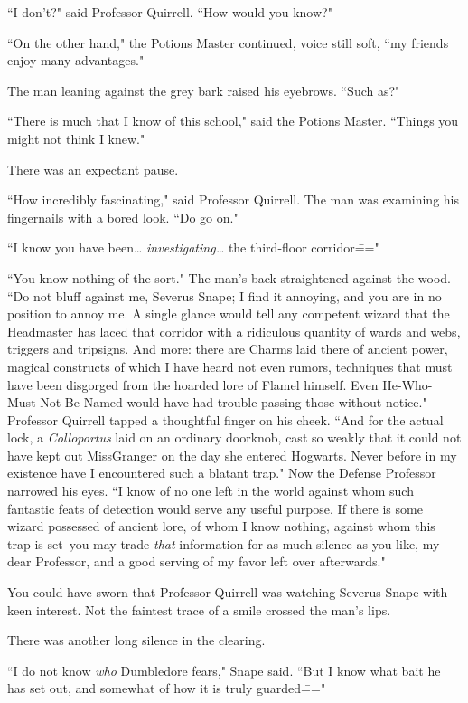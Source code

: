 ``I don't?" said Professor Quirrell. ``How would you know?"

``On the other hand," the Potions Master continued, voice still soft, ``my friends enjoy many advantages."

The man leaning against the grey bark raised his eyebrows. ``Such as?"

``There is much that I know of this school," said the Potions Master. ``Things you might not think I knew."

There was an expectant pause.

``How incredibly fascinating," said Professor Quirrell. The man was examining his fingernails with a bored look. ``Do go on."

``I know you have been{\ldots} \emph{investigating{\ldots}} the third-floor corridor\==="

``You know nothing of the sort." The man's back straightened against the wood. ``Do not bluff against me, Severus Snape; I find it annoying, and you are in no position to annoy me. A single glance would tell any competent wizard that the Headmaster has laced that corridor with a ridiculous quantity of wards and webs, triggers and tripsigns. And more: there are Charms laid there of ancient power, magical constructs of which I have heard not even rumors, techniques that must have been disgorged from the hoarded lore of Flamel himself. Even He-Who-Must-Not-Be-Named would have had trouble passing those without notice." Professor Quirrell tapped a thoughtful finger on his cheek. ``And for the actual lock, a \emph{Colloportus} laid on an ordinary doorknob, cast so weakly that it could not have kept out Miss\?Granger on the day she entered Hogwarts. Never before in my existence have I encountered such a blatant trap." Now the Defense Professor narrowed his eyes. ``I know of no one left in the world against whom such fantastic feats of detection would serve any useful purpose. If there is some wizard possessed of ancient lore, of whom I know nothing, against whom this trap is set\---you may trade \emph{that} information for as much silence as you like, my dear Professor, and a good serving of my favor left over afterwards."

You could have sworn that Professor Quirrell was watching Severus Snape with keen interest. Not the faintest trace of a smile crossed the man's lips.

There was another long silence in the clearing.

``I do not know \emph{who} Dumbledore fears," Snape said. ``But I know what bait he has set out, and somewhat of how it is truly guarded\==="

